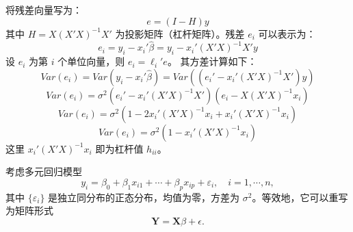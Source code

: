 \begin{questions}
\begin{solution}
将残差向量写为：
\[
e = (I - H)y
\]
其中 $H = X(X'X)^{-1}X'$ 为投影矩阵（杠杆矩阵）。残差 $e_i$ 可以表示为：
\[
e_i = y_i - x_i' \hat{\beta} = y_i - x_i' (X'X)^{-1} X' y
\]
设 $e_i$ 为第 $i$ 个单位向量，则 $e_i = \ell_i' e$。
其方差计算如下：
\[
Var(e_i) = Var(y_i - x_i' \hat{\beta}) = Var((e_i' - x_i' (X'X)^{-1} X') y)
\]
\[
Var(e_i) = \sigma^2 (e_i' - x_i' (X'X)^{-1} X') (e_i - X (X'X)^{-1} x_i)
\]
\[
Var(e_i) = \sigma^2 (1 - 2x_i' (X'X)^{-1} x_i + x_i' (X'X)^{-1} x_i)
\]
\[
Var(e_i) = \sigma^2 (1 - x_i' (X'X)^{-1} x_i)
\]
这里 $x_i' (X'X)^{-1} x_i$ 即为杠杆值 $h_{ii}$。
\end{solution}

\question
考虑多元回归模型
\[
y_i = \beta_0 + \beta_1 x_{i1} + \cdots + \beta_p x_{ip} + \varepsilon_i, \quad i = 1, \cdots, n,
\]
其中 $\{\varepsilon_i\}$ 是独立同分布的正态分布，均值为零，方差为 $\sigma^2$。等效地，它可以重写为矩阵形式
\[
\mathbf{Y} = \mathbf{X}\beta + \epsilon.
\]

\end{questions}
